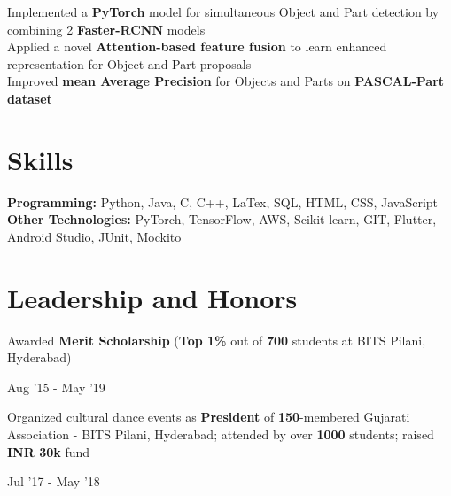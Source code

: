\documentclass[]{Resume}
\begin{document}
\pt Implemented a \textbf{PyTorch} model for simultaneous Object and Part detection by combining 2 \textbf{Faster-RCNN} models \\
\pt Applied a novel \textbf{Attention-based feature fusion} to learn enhanced representation for Object and Part proposals \\
\pt Improved \textbf{mean Average Precision} for Objects and Parts on \textbf{PASCAL-Part dataset}
\sectionsep

\section{Skills} 
\hrulefill

\pt \textbf{Programming:} Python, Java, C, C++, LaTex, SQL, HTML, CSS, JavaScript \\
\pt \textbf{Other Technologies:} PyTorch, TensorFlow, AWS, Scikit-learn, GIT, Flutter, Android Studio, JUnit, Mockito

\sectionsep

\section{Leadership and Honors} 
\hrulefill 

\begin{minipage}[t]{.78\textwidth}
	\pt Awarded \textbf{Merit Scholarship} (\textbf{Top 1\%} out of \textbf{700} students at BITS Pilani, Hyderabad)
\end{minipage}%
\begin{minipage}[t]{.22\textwidth}
	\hfill Aug '15 - May '19
\end{minipage}

\begin{minipage}[t]{.78\textwidth}
	\pt Organized cultural dance events as \textbf{President} of \textbf{150}-membered Gujarati Association - BITS Pilani, Hyderabad; attended by over \textbf{1000} students; raised \textbf{INR 30k} fund
\end{minipage}%
\begin{minipage}[t]{.22\textwidth}
	\hfill Jul '17 - May '18
\end{minipage}


\end{document}
